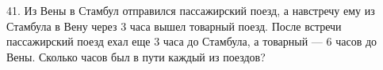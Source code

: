 41. Из Вены в Стамбул отправился пассажирский поезд, а навстречу ему из Стамбула в Вену через 3 часа вышел товарный поезд. После встречи пассажирский поезд ехал еще 3 часа до Стамбула, а товарный ---
6 часов до Вены. Сколько часов был в пути каждый из поездов?\\
